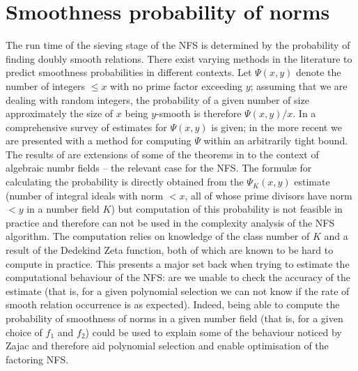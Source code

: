 \documentclass[a4paper, 10pt, envcountsect, runningheads]{lms}
\numberwithin{figure}{section}
\numberwithin{equation}{section}
\begin{document}
\section{Smoothness probability of norms}
\label{s:smooth}
The run time of the sieving stage of the NFS is determined by the probability of finding doubly smooth relations. There exist varying methods in the literature to predict smoothness probabilities in different contexts.
Let $\Psi(x,y)$ denote the number of integers $\leq x$ with no prime factor exceeding $y$; assuming that we are dealing with random integers, the probability of a given number of size approximately the size of $x$ being $y$-smooth is therefore $\Psi(x,y)/x.$ 
In \cite{hild-tene} a comprehensive survey of estimates for $\Psi(x,y)$ is given; in the more recent \cite{dan_psi_est} we are presented with a method for computing $\Psi$ within an arbitrarily tight bound. The results of \cite{krause} are extensions of some of the theorems in \cite{hild-tene} to the context of algebraic numbr fields -- the relevant case for the NFS. The formul{\ae} for calculating the probability is directly obtained from the $\Psi_K(x,y)$ estimate (number of integral ideals with norm $< x$, all of whose prime divisors have norm $< y$ in a number field $K$) \cite[Satz 3]{krause} but computation of this probability is not feasible in practice and therefore can not be used in the complexity analysis of the NFS algorithm. The computation relies on knowledge of the class number of $K$ and a result of the Dedekind Zeta function, both of which are known to be hard to compute in practice.
This presents a major set back when trying to estimate the computational behaviour of the NFS: are we unable to check the accuracy of the estimate (that is, for a given polynomial selection we can not know if the rate of smooth relation occurrence is as expected). Indeed, being able to compute the probability of smoothness of norms in a given number field (that is, for a given choice of $f_1$ and $f_2$) could be used to explain some of the behaviour noticed by Zajac \cite{zajac} and therefore aid polynomial selection and enable optimisation of the factoring NFS. 
\end{document}
